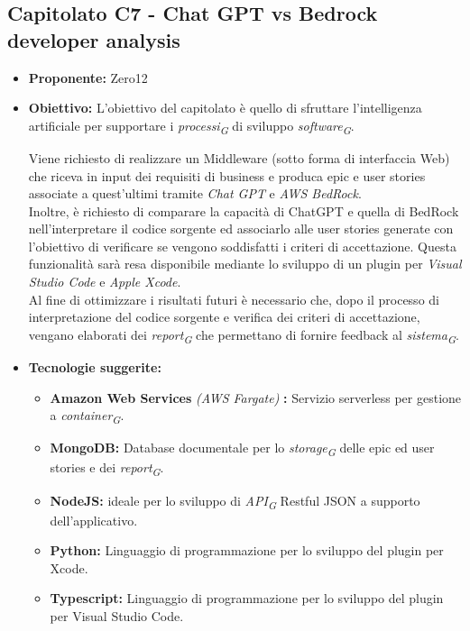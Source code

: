\documentclass{article}
\begin{document}
\subsection{\textbf{Capitolato C7} - Chat GPT vs Bedrock developer analysis}
\begin{itemize}
    \item[] \textbf{Proponente:} Zero12
    
    \item[] \textbf{Obiettivo:} L’obiettivo del capitolato è quello di sfruttare l’intelligenza artificiale per supportare i \textit{processi}\textsubscript{\textit{G}} di sviluppo \textit{software}\textsubscript{\textit{G}}.
    
    Viene richiesto di realizzare un Middleware (sotto forma di interfaccia Web) che riceva in input dei requisiti di business e produca epic e user stories associate a quest’ultimi tramite \textit{Chat GPT} e \textit{AWS BedRock}. \\
    Inoltre, è richiesto di comparare la capacità di ChatGPT e quella di BedRock nell’interpretare il codice sorgente ed associarlo alle user stories generate con l'obiettivo di verificare se vengono soddisfatti i criteri di accettazione. Questa funzionalità sarà resa disponibile mediante lo sviluppo di un plugin per \textit{Visual Studio Code} e \textit{Apple Xcode}. \\
    Al fine di ottimizzare i risultati futuri è necessario che, dopo il processo di interpretazione del codice sorgente e verifica dei criteri di accettazione, vengano elaborati dei \textit{report}\textsubscript{\textit{G}} che permettano di fornire feedback al \textit{sistema}\textsubscript{\textit{G}}.

    \item[] \textbf{Tecnologie suggerite:} 
    \begin{itemize}
        \item \textbf{Amazon Web Services} \textit{(AWS Fargate)} \textbf{:} Servizio serverless per gestione a \textit{container}\textsubscript{\textit{G}}.
        \item \textbf{MongoDB:} Database documentale per lo \textit{storage}\textsubscript{\textit{G}} delle epic ed user stories e dei \textit{report}\textsubscript{\textit{G}}.
        \item \textbf{NodeJS:} ideale per lo sviluppo di \textit{API}\textsubscript{\textit{G}} Restful JSON a supporto dell’applicativo.
        \item \textbf{Python:} Linguaggio di programmazione per lo sviluppo del plugin per Xcode.
        \item \textbf{Typescript:} Linguaggio di programmazione per lo sviluppo del plugin per Visual Studio Code.
    \end{itemize}


\end{itemize}
\end{document}
